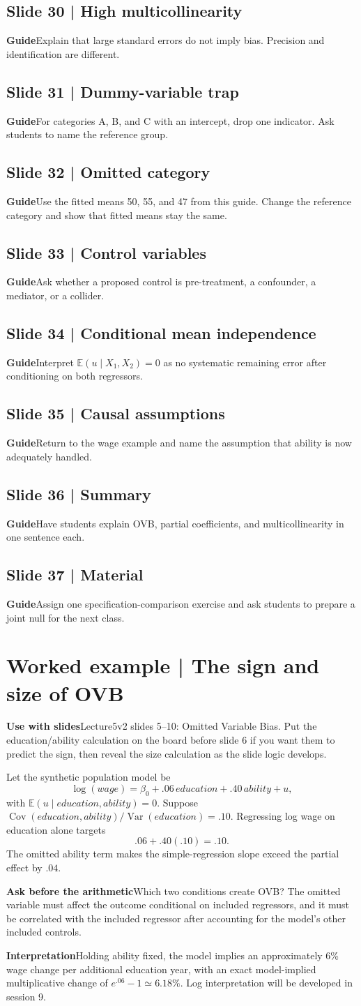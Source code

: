 \documentclass[11pt,a4paper]{article}
\newcommand{\heading}[1]{\section*{\color{accent}#1}}
\newcommand{\slideheading}[1]{\subsection*{\color{accent}#1}}
\newcommand{\cue}[2]{\par\noindent\textbf{#1}\quad #2\par}
\newcommand{\slideguide}[3]{\slideheading{Slide #1 | #2}\cue{Guide}{#3}}
\newcommand{\E}{\mathbb{E}}
\newcommand{\Var}{\operatorname{Var}}
\newcommand{\Cov}{\operatorname{Cov}}
\begin{document}
\slideguide{30}{High multicollinearity}{Explain that large standard errors do not imply bias. Precision and identification are different.}
\slideguide{31}{Dummy-variable trap}{For categories A, B, and C with an intercept, drop one indicator. Ask students to name the reference group.}
\slideguide{32}{Omitted category}{Use the fitted means 50, 55, and 47 from this guide. Change the reference category and show that fitted means stay the same.}
\slideguide{33}{Control variables}{Ask whether a proposed control is pre-treatment, a confounder, a mediator, or a collider.}
\slideguide{34}{Conditional mean independence}{Interpret $\E(u\mid X_1,X_2)=0$ as no systematic remaining error after conditioning on both regressors.}
\slideguide{35}{Causal assumptions}{Return to the wage example and name the assumption that ability is now adequately handled.}
\slideguide{36}{Summary}{Have students explain OVB, partial coefficients, and multicollinearity in one sentence each.}
\slideguide{37}{Material}{Assign one specification-comparison exercise and ask students to prepare a joint null for the next class.}

\heading{Worked example | The sign and size of OVB}
\cue{Use with slides}{Lecture5v2 slides 5--10: Omitted Variable Bias. Put the education/ability calculation on the board before slide 6 if you want them to predict the sign, then reveal the size calculation as the slide logic develops.}
Let the synthetic population model be
\[
\log(wage)=\beta_0+.06\,education+.40\,ability+u,
\]
with $\E(u\mid education,ability)=0$. Suppose
$\Cov(education,ability)/\Var(education)=.10$. Regressing log wage on education alone targets
\[
.06+.40(.10)=.10.
\]
The omitted ability term makes the simple-regression slope exceed the partial effect by $.04$.
\cue{Ask before the arithmetic}{Which two conditions create OVB? The omitted variable must affect the outcome conditional on included regressors, and it must be correlated with the included regressor after accounting for the model's other included controls.}
\cue{Interpretation}{Holding ability fixed, the model implies an approximately 6\% wage change per additional education year, with an exact model-implied multiplicative change of $e^{.06}-1\simeq6.18\%$. Log interpretation will be developed in session 9.}
\end{document}
